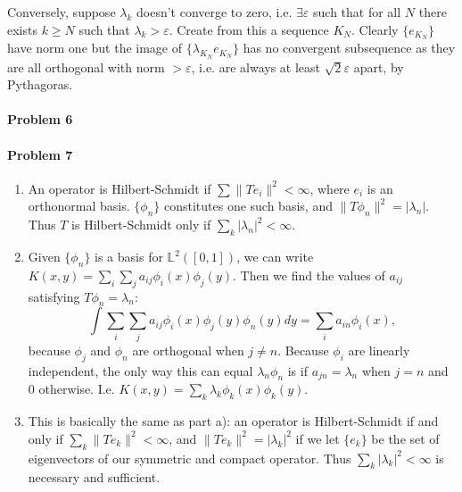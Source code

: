 \documentclass[12pt]{article}
\begin{document}
Conversely, suppose $\lambda_k$ doesn't converge to zero, i.e. $\exists
\varepsilon$ such that for all $N$ there exists $k \geq N$ such that $\lambda_k
> \varepsilon$. Create from this a sequence $K_N$. Clearly $\{e_{K_N}\}$ have
norm one but the image of $\{\lambda_{K_N}e_{K_N}\}$ has no convergent
subsequence
as they are all orthogonal with norm $> \varepsilon$, i.e. are always at least
$\sqrt{2}\varepsilon$ apart, by Pythagoras.

\paragraph{Problem 6}

\paragraph{Problem 7}
\begin{enumerate}[label=\alph*)]
\item An operator is Hilbert-Schmidt if $\sum\|Te_i\|^2 < \infty$, where $e_i$
  is an orthonormal basis. $\{\phi_n\}$ constitutes one such basis, and
  $\|T\phi_n\|^2 = |\lambda_n|$. Thus $T$ is Hilbert-Schmidt only if
  $\sum_k|\lambda_n|^2 < \infty$.
\item Given $\{\phi_n\}$ is a basis for $\mathbb{L}^2([0,1])$, we can write
  $K(x,y) = \sum_i\sum_ja_{ij}\phi_i(x)\phi_j(y)$. Then we find the values of
  $a_{ij}$ satisfying $T\phi_n = \lambda_n$:
  \begin{displaymath}
    \int\sum_i\sum_ja_{ij}\phi_i(x)\phi_j(y)\phi_n(y)dy
    = \sum_ia_{in}\phi_i(x),
  \end{displaymath}
  because $\phi_j$ and $\phi_n$ are orthogonal when $j\neq n$. Because $\phi_i$
  are linearly independent, the only way this can equal $\lambda_n\phi_n$ is if
  $a_{jn} =\lambda_n$ when $j=n$ and 0 otherwise. I.e. $K(x,y) = \sum_k
  \lambda_k\phi_k(x)\phi_k(y)$.
\item This is basically the same as part a): an operator is Hilbert-Schmidt if
  and only if $\sum_k\|Te_k\|^2 < \infty$, and $\|Te_k\|^2 = |\lambda_k|^2$ if
  we let $\{e_k\}$ be the set of eigenvectors of our symmetric and compact
  operator. Thus $\sum_k|\lambda_k|^2 < \infty$ is necessary and sufficient.
  

\end{enumerate}
\end{document}
